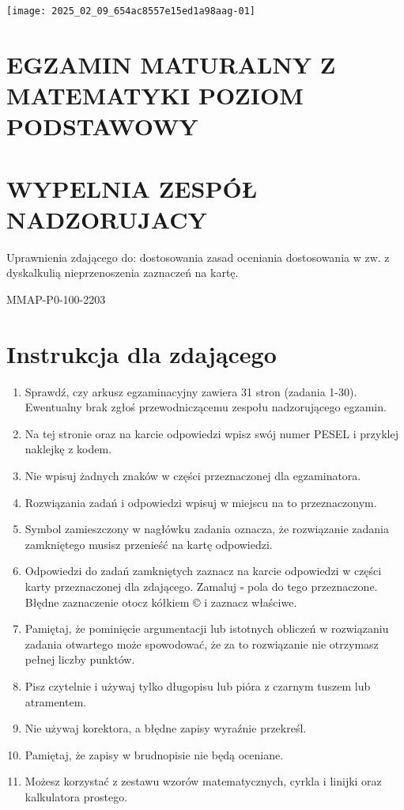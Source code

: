 \documentclass[10pt]{article}
\begin{document}
\begin{center}
\texttt{[image: 2025\_02\_09\_654ac8557e15ed1a98aag-01]}
\end{center}

\section*{EGZAMIN MATURALNY Z MATEMATYKI POZIOM PODSTAWOWY}
\section*{WYPELNIA ZESPÓŁ NADZORUJACY}
Uprawnienia zdającego do: dostosowania zasad oceniania dostosowania w zw. z dyskalkulią nieprzenoszenia zaznaczeń na kartę.

MMAP-P0-100-2203

\section*{Instrukcja dla zdającego}
\begin{enumerate}
  \item Sprawdź, czy arkusz egzaminacyjny zawiera 31 stron (zadania 1-30). Ewentualny brak zgłoś przewodniczącemu zespołu nadzorującego egzamin.
  \item Na tej stronie oraz na karcie odpowiedzi wpisz swój numer PESEL i przyklej naklejkę z kodem.
  \item Nie wpisuj żadnych znaków w części przeznaczonej dla egzaminatora.
  \item Rozwiązania zadań i odpowiedzi wpisuj w miejscu na to przeznaczonym.
  \item Symbol zamieszczony w nagłówku zadania oznacza, że rozwiązanie zadania zamkniętego musisz przenieść na kartę odpowiedzi.
  \item Odpowiedzi do zadań zamkniętych zaznacz na karcie odpowiedzi w części karty przeznaczonej dla zdającego. Zamaluj \(\square\) pola do tego przeznaczone. Błędne zaznaczenie otocz kółkiem © i zaznacz właściwe.
  \item Pamiętaj, że pominięcie argumentacji lub istotnych obliczeń w rozwiązaniu zadania otwartego może spowodować, że za to rozwiązanie nie otrzymasz pełnej liczby punktów.
  \item Pisz czytelnie i używaj tylko długopisu lub pióra z czarnym tuszem lub atramentem.
  \item Nie używaj korektora, a błędne zapisy wyraźnie przekreśl.
  \item Pamiętaj, że zapisy w brudnopisie nie będą oceniane.
  \item Możesz korzystać z zestawu wzorów matematycznych, cyrkla i linijki oraz kalkulatora prostego.
\end{enumerate}
\end{document}
